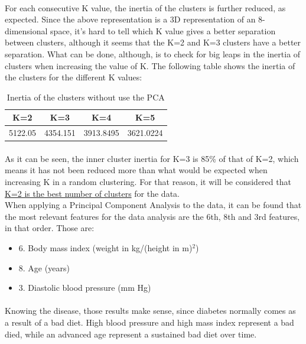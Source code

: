 \documentclass[12pt, a4paper]{article}
\begin{document}
\paragraph{}For each consecutive K value, the inertia of the clusters is further reduced, as expected. Since the above representation is a 3D representation of an 8-dimensional space, it's hard to tell which K value gives a better separation between clusters, although it seems that the K=2 and K=3 clusters have a better separation. What can be done, although, is to check for big leaps in the inertia of clusters when increasing the value of K. The following table shows the inertia of the clusters for the different K values:
\begin{table}[ht!]
	\centering
	\begin{tabular}{|c|c|c|c|}
		\hline
		\rowcolor[gray]{0.85} \textbf{K=2}&\textbf{K=3}&\textbf{K=4}&\textbf{K=5}\\\hline
		5122.05&4354.151&3913.8495&3621.0224\\\hline
	\end{tabular}
	\label{tab:diabetes}
	\caption{Inertia of the clusters without use the PCA}
\end{table}
\paragraph{}As it can be seen, the inner cluster inertia for K=3 is 85\% of that of K=2, which means it has not been reduced more than what would be expected when increasing K in a random clustering. For that reason, it will be considered that \underline{K=2 is the best number of clusters} for the data.\\

When applying a Principal Component Analysis to the data,  it can be found that the most relevant features for the data analysis are the 6th, 8th and 3rd features, in that order. Those are:
\begin{itemize}
	\item 6. Body mass index (weight in kg/(height in m)$^2$)
	\item 8. Age (years)
	\item 3. Diastolic blood pressure (mm Hg)
\end{itemize}
\paragraph{}Knowing the disease, those results make sense, since diabetes normally comes as a result of a bad diet. High blood pressure and high mass index represent a bad died, while an advanced age represent a sustained bad diet over time.\\
\end{document}
